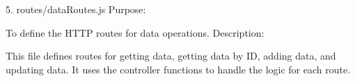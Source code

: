 5. routes/dataRoutes.js
Purpose:

To define the HTTP routes for data operations.
Description:

This file defines routes for getting data, getting data by ID, adding data, and updating data. 
It uses the controller functions to handle the logic for each route.
